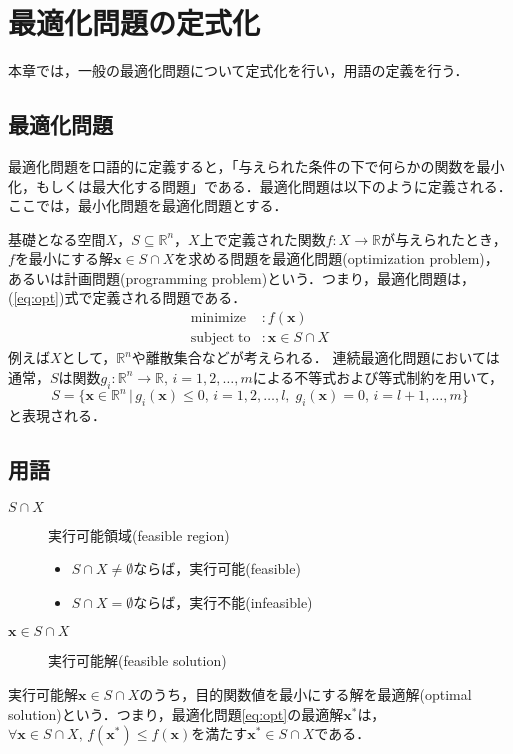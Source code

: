 \documentclass{jsreport}
\begin{document}
\chapter{最適化問題の定式化}\label{chp:opt}
本章では，一般の最適化問題について定式化を行い，用語の定義を行う．
\section{最適化問題}
最適化問題を口語的に定義すると，「与えられた条件の下で何らかの関数を最小化，もしくは最大化する問題」である．最適化問題は以下のように定義される．ここでは，最小化問題を最適化問題とする．

基礎となる空間$X$，$S \subseteq \mathbb{R}^n$，$X$上で定義された関数$f: X \rightarrow \mathbb{R}$が与えられたとき，$f$を最小にする解$\bm{x} \in S \cap X$を求める問題を最適化問題(optimization problem)，あるいは計画問題(programming problem)という．つまり，最適化問題は，(\ref{eq:opt})式で定義される問題である．
\begin{align}\label{eq:opt}
  \mathrm{minimize} &: f(\bm{x}) \nonumber\\
  \mathrm{subject \; to} &: \bm{x} \in S \cap X
\end{align}
例えば$X$として，$\mathbb{R}^n$や離散集合などが考えられる．
連続最適化問題においては通常，$S$は関数$g_i: \mathbb{R}^n \rightarrow \mathbb{R}, \, i = 1, 2, \ldots, m$による不等式および等式制約を用いて，
\begin{equation}\label{eq:const}
  S = \{\bm{x} \in \mathbb{R}^n \, | \, g_i(\bm{x}) \leq 0, \, i = 1, 2, \ldots, l, \; g_i(\bm{x}) = 0, \, i = l + 1, \ldots, m\}
\end{equation}
と表現される．

\section{用語}
\begin{description}
  \item[$S \cap X$] 実行可能領域(feasible region)
  \begin{itemize}
    \item $S \cap X \neq \emptyset$ならば，実行可能(feasible)
    \item $S \cap X = \emptyset$ならば，実行不能(infeasible)
  \end{itemize}
  \item[$\bm{x} \in S \cap X$] 実行可能解(feasible solution)
\end{description}

実行可能解$\bm{x} \in S \cap X$のうち，目的関数値を最小にする解を最適解(optimal solution)という．つまり，最適化問題\ref{eq:opt}の最適解$\bm{x}^*$は，$\forall \bm{x} \in S \cap X, \, f(\bm{x}^*) \leq f(\bm{x})$を満たす$\bm{x}^* \in S \cap X$である．
\end{document}
